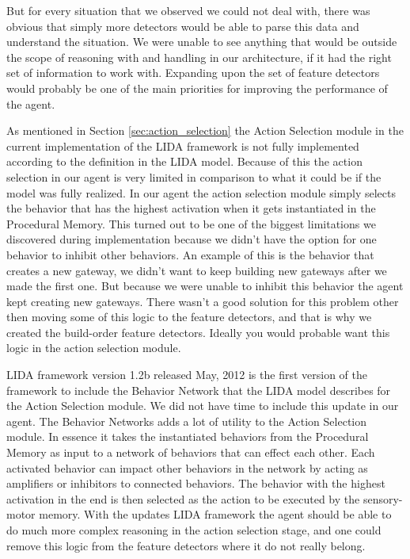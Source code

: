 But for every situation that we observed we could not deal with, there was obvious that simply more detectors would be able to parse this data and understand the situation. We were unable to see anything that would be outside the scope of reasoning with and handling in our architecture, if it had the right set of information to work with. Expanding upon the set of feature detectors would probably be one of the main priorities for improving the performance of the agent.

As mentioned in Section \ref{sec:action_selection} the Action Selection module in the current implementation of the LIDA framework is not fully implemented according to the definition in the LIDA model. Because of this the action selection in our agent is very limited in comparison to what it could be if the model was fully realized. In our agent the action selection module simply selects the behavior that has the highest activation when it gets instantiated in the Procedural Memory. This turned out to be one of the biggest limitations we discovered during implementation because we didn't have the option for one behavior to inhibit other behaviors. An example of this is the behavior that creates a new gateway, we didn't want to keep building new gateways after we made the first one. But because we were unable to inhibit this behavior the agent kept creating new gateways. There wasn't a good solution for this problem other then moving some of this logic to the feature detectors, and that is why we created the build-order feature detectors. Ideally you would probable want this logic in the action selection module.

LIDA framework version 1.2b released May, 2012 is the first version of the framework to include the Behavior Network that the LIDA model describes for the Action Selection module. We did not have time to include this update in our agent. The Behavior Networks adds a lot of utility to the Action Selection module. In essence it takes the instantiated behaviors from the Procedural Memory as input to a network of behaviors that can effect each other. Each activated behavior can impact other behaviors in the network by acting as amplifiers or inhibitors to connected behaviors. The behavior with the highest activation in the end is then selected as the action to be executed by the sensory-motor memory. With the updates LIDA framework the agent should be able to do much more complex reasoning in the action selection stage, and one could remove this logic from the feature detectors where it do not really belong.

